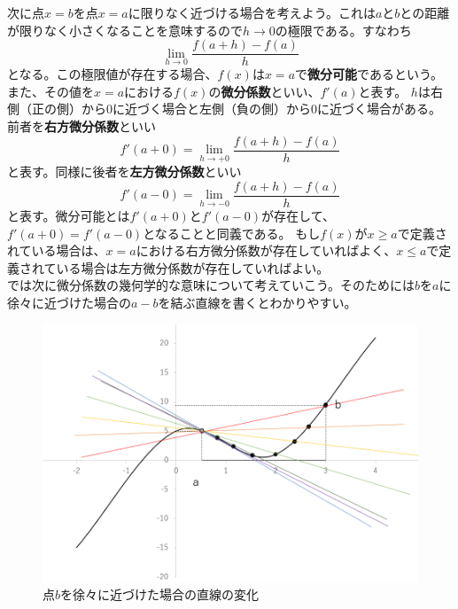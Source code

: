 \documentclass[a4j,dvipdfmx]{jsarticle}
\begin{document}
            次に点$x=b$を点$x=a$に限りなく近づける場合を考えよう。これは$a$と$b$との距離が限りなく小さくなることを意味するので$h\to 0$の極限である。すなわち
            \begin{equation}
                \lim_{h\to 0}\frac{f(a+h)-f(a)}{h}
            \end{equation}
            となる。この極限値が存在する場合、$f(x)$は$x=a$で\textbf{微分可能}であるという。また、その値を$x=a$における$f(x)$の\textbf{微分係数}といい、$f'(a)$と表す。
            \clearpage
            $h$は右側（正の側）から0に近づく場合と左側（負の側）から0に近づく場合がある。
            前者を\textbf{右方微分係数}といい
            \begin{equation}
                f'(a+0)=\lim_{h\to +0}\frac{f(a+h)-f(a)}{h}
            \end{equation}
            と表す。同様に後者を\textbf{左方微分係数}といい
            \begin{equation}
                f'(a-0)=\lim_{h\to -0}\frac{f(a+h)-f(a)}{h}
            \end{equation}
            と表す。微分可能とは$f'(a+0)$と$f'(a-0)$が存在して、$f'(a+0)=f'(a-0)$となることと同義である。
            もし$f(x)$が$x\geq a$で定義されている場合は、$x=a$における右方微分係数が存在していればよく、$x\leq a$で定義されている場合は左方微分係数が存在していればよい。
            \\

            では次に微分係数の幾何学的な意味について考えていこう。そのためには$b$を$a$に徐々に近づけた場合の$a-b$を結ぶ直線を書くとわかりやすい。
            \begin{figure}[h]
                \centering
                \includegraphics[scale=0.5]{img/QuuNote/differentialCoefficieant_Graph.png}
                \caption{点$b$を徐々に近づけた場合の直線の変化}
            \end{figure}
\end{document}
